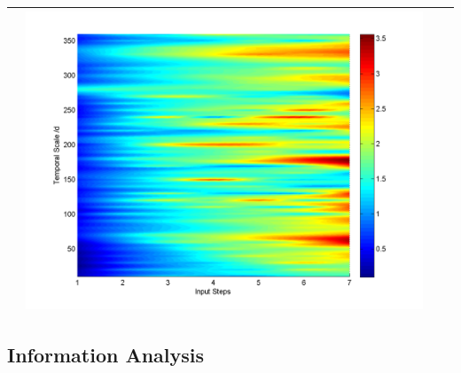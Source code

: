 \documentclass[11pt]{article}
\begin{document}
\begin{table}[H]
{\begin{tabular}{c  c   c   c  }
&\begin{minipage}{.3\textwidth}\includegraphics[width=\linewidth]{resultgraph/07183000pepq.png}\end{minipage}
\\ 
\bottomrule
\end{tabular}
}
\end{table}

\subsection*{Information Analysis}
     
\end{document}
